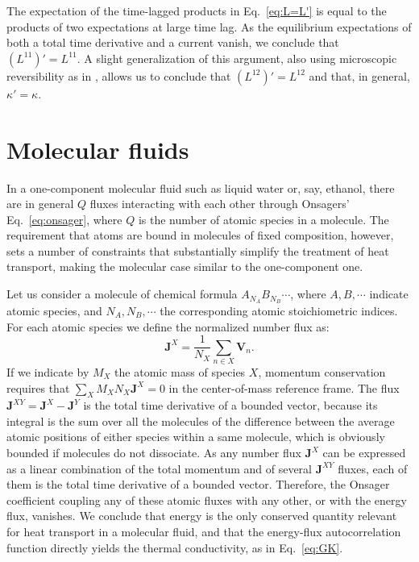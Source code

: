 The expectation of the time-lagged products in Eq.~\eqref{eq:L=L'} is equal to the products of two expectations at large time lag. As the equilibrium expectations of both a total time derivative and a current vanish, we conclude that $\left (L^{11}\right )'=L^{11}$. A slight generalization of this argument, also using microscopic reversibility as in \cite{Onsager1931a,Onsager1931b}, allows us to conclude that $\left (L^{12} \right )'=L^{12}$ and that, in general, $\kappa'=\kappa$.


\section{Molecular fluids} \label{sec:MolecularFluids}
In a one-component molecular fluid such as liquid water or, say, ethanol, there are in general $Q$ fluxes interacting with each other through Onsagers' Eq.~\eqref{eq:onsager}, where $Q$ is the number of atomic species in a molecule. The requirement that atoms are bound in molecules of fixed composition, however, sets a number of constraints that substantially simplify the treatment of heat transport, making the molecular case similar to the one-component one.

Let us consider a molecule of chemical formula $A_{N_A} B_{N_B}\cdots$, where $A, B,\cdots$ indicate atomic species, and $N_A,N_B,\cdots$ the corresponding atomic stoichiometric indices. For each atomic species we define the normalized number flux as:
\begin{equation}
  \mathbf{J}^X = \frac{1}{N_X}\sum_{n\in X} \mathbf{V}_n. \label{eq:JX}
\end{equation}
If we indicate by $M_X$ the atomic mass of species $X$, momentum conservation requires that $\sum_X M_X N_X \mathbf{J}^X = 0$ in the center-of-mass reference frame. The flux $\mathbf{J}^{XY} = \mathbf{J}^{X}-\mathbf{J}^{Y}$ is the total time derivative of a bounded vector, because its integral is the sum over all the molecules of the difference between the average atomic positions of either species within a same molecule, which is obviously bounded if molecules do not dissociate. As any number flux $\mathbf{J}^X$ can be expressed as a linear combination of the total momentum and of several $\mathbf{J}^{XY}$ fluxes, each of them is the total time derivative of a bounded vector. Therefore, the Onsager coefficient coupling any of these atomic fluxes with any other, or with the energy flux, vanishes. We conclude that energy is the only conserved quantity relevant for heat transport in a molecular fluid, and that the energy-flux autocorrelation function directly yields the thermal conductivity, as in Eq.~\eqref{eq:GK}.

